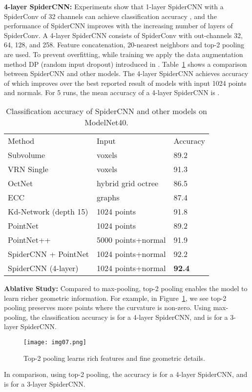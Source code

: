 \documentclass[runningheads]{llncs}
\begin{document}
{\noindent \bf 4-layer SpiderCNN: } 
Experiments show that 1-layer SpiderCNN with a SpiderConv of 32 channels can achieve classification accuracy , and the performance of SpiderCNN improves with the increasing number of layers of SpiderConv. A 4-layer SpiderCNN consists of SpiderConv with out-channels 32, 64, 128, and 258. Feature concatenation, 20-nearest neighbors and top-2 pooling are used. To prevent overfitting, while training we apply the data augmentation method DP (random input dropout) introduced in \cite{qi2017pointnet++}. 
Table~\ref{table:modelnet40} shows a comparison between SpiderCNN and other models. The 4-layer SpiderCNN achieves accuracy of  which improves over the best reported result of models with input 1024 points and normals.
For 5 runs, the mean accuracy of a 4-layer SpiderCNN is .

\setlength{\tabcolsep}{4pt}
\begin{table}
\begin{center}
\caption{Classification accuracy of SpiderCNN and other models on ModelNet40.} 
\label{table:modelnet40}
\begin{tabular}{lll}
\hline\noalign{\smallskip}
Method & Input & Accuracy\\
\noalign{\smallskip}
\hline
\noalign{\smallskip}
Subvolume \cite{qi2016volumetric} & voxels & 89.2
\\
VRN Single \cite{brock2016generative} & voxels & 91.3
\\
OctNet \cite{riegler2017octnet} & hybrid grid octree & 86.5
\\
ECC \cite{simonovsky2017dynamic} & graphs & 87.4
\\
\hline
Kd-Network \cite{klokov2017escape} (depth 15) & 1024 points & 91.8
\\
PointNet \cite{qi2017pointnet}& 1024 points & 89.2
\\
PointNet++ \cite{qi2017pointnet++}& 5000 points+normal & 91.9
\\
\hline
SpiderCNN + PointNet & 1024 points+normal & 92.2
\\
SpiderCNN (4-layer) & 1024 points+normal & \bf{92.4}
\\ 
\hline
\end{tabular}
\end{center}
\end{table}
\setlength{\tabcolsep}{1.4pt}

{\noindent \bf Ablative Study:}
Compared to max-pooling, top-2 pooling enables the model to learn richer geometric information. For example, in Figure~\ref{fig:topk2}, we see top-2 pooling preserves more points where the curvature is non-zero. Using max-pooling, the classification accuracy is  for a 4-layer SpiderCNN, and is  for a 3-layer SpiderCNN. 
\begin{figure}
\centering
\texttt{[image: img07.png]} 
\caption{
Top-2 pooling learns rich features and fine geometric details.
}
\label{fig:topk2}
\end{figure}
In comparison, using top-2 pooling, the accuracy is  for a 4-layer SpiderCNN, and  is  for a 3-layer SpiderCNN. 
\end{document}
